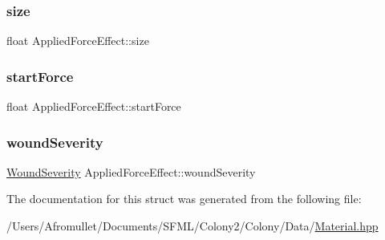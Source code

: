 \subsubsection{\texorpdfstring{size}{size}}
{\footnotesize\ttfamily float Applied\+Force\+Effect\+::size}

\mbox{\label{struct_applied_force_effect_a041935c570639c9f1f87e34e114f204e}} 
\subsubsection{\texorpdfstring{start\+Force}{startForce}}
{\footnotesize\ttfamily float Applied\+Force\+Effect\+::start\+Force}

\mbox{\label{struct_applied_force_effect_a5aa8b89ec11b997955d4160b3fb671ec}} 
\subsubsection{\texorpdfstring{wound\+Severity}{woundSeverity}}
{\footnotesize\ttfamily \mbox{\hyperlink{_enum_types_8hpp_a295be2e2d0f307f31ad832b24a7736c6}{Wound\+Severity}} Applied\+Force\+Effect\+::wound\+Severity}



The documentation for this struct was generated from the following file\+:\begin{DoxyCompactItemize}
\item 
/\+Users/\+Afromullet/\+Documents/\+S\+F\+M\+L/\+Colony2/\+Colony/\+Data/\mbox{\hyperlink{_material_8hpp}{Material.\+hpp}}\end{DoxyCompactItemize}
